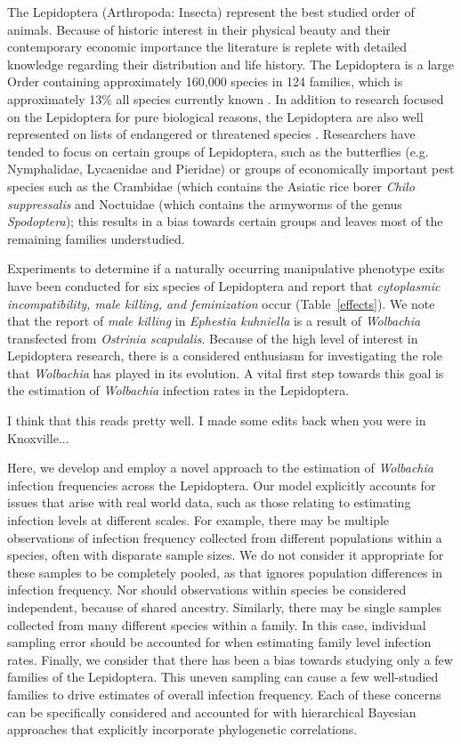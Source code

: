 \documentclass{frontiersSCNS}
\begin{document}
The Lepidoptera (Arthropoda: Insecta) represent the best studied order of animals. Because of historic interest in their physical beauty and their contemporary economic importance the literature is replete with detailed knowledge regarding their distribution and life history. The  Lepidoptera is a large Order containing approximately 160,000 species in 124 families, which is approximately 13\% all species currently known \cite{Regier:2013fp}. In addition to research focused on the Lepidoptera for pure biological reasons, the Lepidoptera are also well represented on lists of endangered or threatened species \citep{Hamm:2014wi}. Researchers have tended to focus on certain groups of Lepidoptera, such as the butterflies (e.g. Nymphalidae, Lycaenidae and Pieridae) or groups of economically important pest species such as the Crambidae (which contains the Asiatic rice borer \textit{Chilo suppressalis} and Noctuidae (which contains the armyworms of the genus \textit{Spodoptera}); this results in a bias towards certain groups and leaves most of the remaining families understudied. 

Experiments to determine if a naturally occurring manipulative phenotype exits have been conducted for six species of Lepidoptera and report that \emph{cytoplasmic incompatibility, male killing, \emph{and} feminization} occur (Table~\ref{effects}). We note that the report of \textit{male killing} in \textit{Ephestia kuhniella} is a result of \textit{Wolbachia} transfected from \textit{Ostrinia scapulalis}. Because of the high level of interest in Lepidoptera research, there is a considered enthusiasm for investigating the role that \textit{Wolbachia} has played in its evolution. A vital first step towards this goal is the estimation of \textit{Wolbachia} infection rates in the Lepidoptera. 

I think that this reads pretty well. I made some edits back when you were in Knoxville...

Here, we develop and employ a novel approach to the estimation of \textit{Wolbachia} infection frequencies across the Lepidoptera. Our model explicitly accounts for issues that arise with real world data, such as those relating to estimating infection levels at different scales. For example, there may be multiple observations of infection frequency collected from different populations within a species, often with disparate sample sizes. We do not consider it appropriate for these samples to be completely pooled, as that ignores population differences in infection frequency. Nor should observations within species be considered independent, because of shared ancestry. Similarly, there may be single samples collected from many different species within a family. In this case, individual sampling error should be accounted for when estimating family level infection rates. Finally, we consider that there has been a bias towards studying only a few families of the Lepidoptera. This uneven sampling can cause a few well-studied families to drive estimates of overall infection frequency. Each of these concerns can be specifically considered and accounted for with hierarchical Bayesian approaches that explicitly incorporate phylogenetic correlations. 
\end{document}
